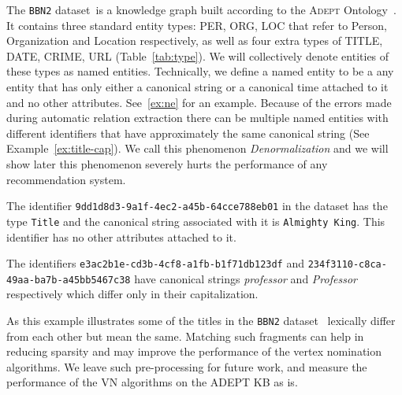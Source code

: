 \documentclass[paper=a4,fontsize=11pt]{scrartcl}
\newcommand{\Tabref}[1]{Table~\ref{#1}}
\newcommand{\Exref}[1]{Example~\ref{#1}}
\numberwithin{equation}{section}    %
\numberwithin{figure}{section}      %
\numberwithin{table}{section}       %
\newcommand{\dataset}[0]{\texttt{BBN2} dataset\ }
\newcommand{\ontology}{\textsc{Adept} Ontology\ }
\begin{document}
The \dataset is a knowledge graph built according to the \ontology.
It contains three standard entity types: \textsc{PER, ORG, LOC}
that refer to Person, Organization and Location respectively, as well
as four extra types of \textsc{TITLE, DATE, CRIME, URL} (\Tabref{tab:type}).
We will collectively denote entities
of these types as named entities. Technically, we define a named entity to be a
any entity that has only either a canonical string
or a canonical time attached to it and no other attributes.
See~\ref{ex:ne}  for an example.
Because of the errors made during automatic relation extraction there can be multiple
named entities with different identifiers that have approximately the same canonical string
(See \Exref{ex:title-cap}). We call this phenomenon \textit{Denormalization} and we will show
later this phenomenon severely hurts the performance of any recommendation system.
\begin{example}\label{ex:ne}
  The identifier \texttt{9dd1d8d3-9a1f-4ec2-a45b-64cce788eb01} in the dataset has
the type \texttt{Title}
and the canonical string associated with it is \texttt{Almighty King}. This
identifier has no other attributes attached to it.
\end{example}
\begin{example}\label{ex:title-cap}
  The identifiers \texttt{e3ac2b1e-cd3b-4cf8-a1fb-b1f71db123df} and
  \texttt{234f3110-c8ca-49aa-ba7b-a45bb5467c38} have canonical strings \textit{professor} and
  \textit{Professor} respectively which differ only in their capitalization.

  As this example illustrates some of the titles in the \dataset
  lexically differ from each other but mean the same. Matching such fragments
  can help in reducing sparsity and may improve the performance of the vertex
  nomination algorithms. We leave such pre-processing for future work, and
  measure the performance of the VN algorithms on the ADEPT KB as is.
\end{example}
\end{document}
